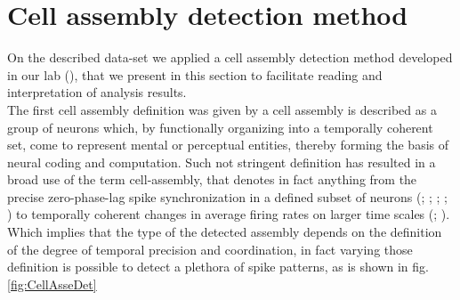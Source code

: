 \section{Cell assembly detection method}
\label{chap:AssemblyMethod}
On the described data-set we applied a cell assembly detection method developed in our lab (\cite{RussoDurstewitz}), that we present in this section to facilitate reading and interpretation of analysis results.\\
The first cell assembly definition was given by \cite{Hebb} a cell assembly is described as a group of neurons which, by functionally organizing into a temporally coherent set, come to represent mental or perceptual entities, thereby forming the basis of neural coding and computation. Such not stringent definition has resulted in a broad use of the term cell-assembly, that denotes in fact anything from the precise zero-phase-lag spike synchronization in a defined subset of neurons (\cite{Abeles}; \cite{Singer}; \cite{Roelfsema}; \cite{Diesmann}; \cite{Harris2003}) to temporally coherent changes in average firing rates on larger time scales (\cite{Goldman}; \cite{Durstewitz}).\\Which implies that the type of the detected assembly depends on the definition of the degree of temporal precision and coordination, in fact varying those definition is possible to detect a plethora of spike patterns, as is shown in fig.\ref{fig:CellAsseDet} \\
